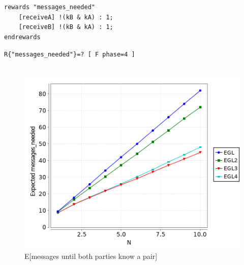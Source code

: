 \documentclass[12pt]{article}
\begin{document}
\section{}

\begin{lstlisting}[caption=Reward structure for E{[messages until both parties know a pair]}]
rewards "messages_needed"
	[receiveA] !(kB & kA) : 1;
	[receiveB] !(kB & kA) : 1;
endrewards
\end{lstlisting}

\begin{lstlisting}[caption=Property for calculating E{[messages until both parties know a pair]},language=pctl]
R{"messages_needed"}=? [ F phase=4 ]
\end{lstlisting}

\clearpage

\section{}
\begin{figure}[H]
  \caption{E[messages until both parties know a pair]}
  \centering
    \includegraphics[width=1\textwidth]{egl1234_expected_messages_both_parties_2.png}
\end{figure}
\end{document}
